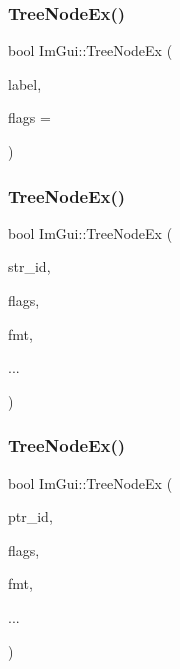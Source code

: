 \mbox{\label{namespaceImGui_a21f62e092dac9556a15a8edee2f70522}} 
\subsubsection{\texorpdfstring{Tree\+Node\+Ex()}{TreeNodeEx()}\hspace{0.1cm}{\footnotesize\ttfamily [1/3]}}
{\footnotesize\ttfamily bool Im\+Gui\+::\+Tree\+Node\+Ex (\begin{DoxyParamCaption}\item[{const char $\ast$}]{label,  }\item[{Im\+Gui\+Tree\+Node\+Flags}]{flags = {} }\end{DoxyParamCaption})}

\mbox{\label{namespaceImGui_a9ca2fae922b38cfddc3259f874c18a5d}} 
\subsubsection{\texorpdfstring{Tree\+Node\+Ex()}{TreeNodeEx()}\hspace{0.1cm}{\footnotesize\ttfamily [2/3]}}
{\footnotesize\ttfamily bool Im\+Gui\+::\+Tree\+Node\+Ex (\begin{DoxyParamCaption}\item[{const char $\ast$}]{str\+\_\+id,  }\item[{Im\+Gui\+Tree\+Node\+Flags}]{flags,  }\item[{const char $\ast$}]{fmt,  }\item[{}]{... }\end{DoxyParamCaption})}

\mbox{\label{namespaceImGui_adce362ad94baa9b00f5914cbcab00452}} 
\subsubsection{\texorpdfstring{Tree\+Node\+Ex()}{TreeNodeEx()}\hspace{0.1cm}{\footnotesize\ttfamily [3/3]}}
{\footnotesize\ttfamily bool Im\+Gui\+::\+Tree\+Node\+Ex (\begin{DoxyParamCaption}\item[{const \hyperlink{imgui__impl__opengl3__loader_8h_ac668e7cffd9e2e9cfee428b9b2f34fa7}{void} $\ast$}]{ptr\+\_\+id,  }\item[{Im\+Gui\+Tree\+Node\+Flags}]{flags,  }\item[{const char $\ast$}]{fmt,  }\item[{}]{... }\end{DoxyParamCaption})}


